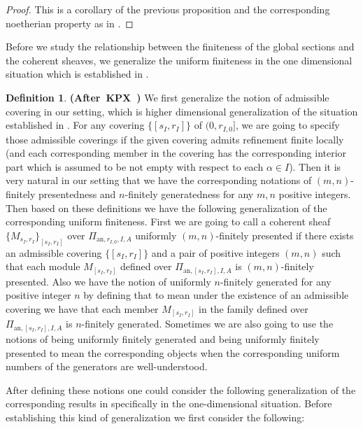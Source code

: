 \documentclass[12pt]{amsart}
\theoremstyle{definition}
\newtheorem{definition}[theorem]{Definition}
\numberwithin{equation}{section}
\begin{document}
\begin{proof}
This is a corollary of the previous proposition and the corresponding noetherian property as in \cite[Corollary 2.1.7]{KPX}.	
\end{proof}






\indent Before we study the relationship between the finiteness of the global sections and the coherent sheaves, we generalize the uniform finiteness in the one dimensional situation which is established in \cite[Definition 2.1.9]{KPX}.


\begin{definition} \mbox{\bf{(After KPX \cite[Definition 2.1.9]{KPX})}} 
We first generalize the notion of admissible covering in our setting, which is higher dimensional generalization of the situation established in \cite[Definition 2.1.9]{KPX}. For any covering $\{[s_I,r_I]\}$ of $(0,r_{I,0}]$, we are going to specify those admissible coverings if the given covering admits refinement finite locally (and each corresponding member in the covering has the corresponding interior part which is assumed to be not empty with respect to each $\alpha\in I$). Then it is very natural in our setting that we have the corresponding notations of $(m,n)$-finitely presentedness and $n$-finitely generatedness for any $m,n$ positive integers. Then based on these definitions we have the following generalization of the corresponding uniform finiteness. First we are going to call a coherent sheaf $\{M_{s_I,r_I}\}_{[s_I,r_I]}$ over $\Pi_{\mathrm{an},r_{I,0},I,A}$ uniformly $(m,n)$-finitely presented if there exists an admissible covering $\{[s_I,r_I]\}$ and a pair of positive integers $(m,n)$ such that each module $M_{[s_I,r_I]}$ defined over $\Pi_{\mathrm{an},[s_I,r_I],I,A}$ is $(m,n)$-finitely presented. Also we have the notion of uniformly $n$-finitely generated for any positive integer $n$ by defining that to mean under the existence of an admissible covering we have that each member $M_{[s_I,r_I]}$ in the family defined over $\Pi_{\mathrm{an},[s_I,r_I],I,A}$ is $n$-finitely generated. Sometimes we are also going to use the notions of being uniformly finitely generated and being uniformly finitely presented to mean the corresponding objects when the corresponding uniform numbers of the generators are well-understood.
\end{definition}


\indent After defining these notions one could consider the following generalization of the corresponding results in \cite[Lemma 2.1.10]{KPX} specifically in the one-dimensional situation. Before establishing this kind of generalization we first consider the following:
\end{document}
